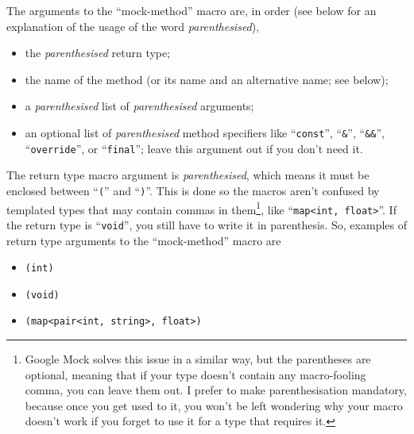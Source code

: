 \documentclass[twoside, a4paper, article]{memoir}
\begin{document}
The arguments to the ``mock-method'' macro are, in order (see below for an
explanation of the usage of the word \emph{parenthesised}),
\begin{itemize}
\item the \emph{parenthesised} return type;
\item the name of the method (or its name and an alternative name; see below);
\item a \emph{parenthesised} list of \emph{parenthesised} arguments;
\item an optional list of \emph{parenthesised} method specifiers like
  ``\texttt{const}'', ``\texttt{\&}'', ``\texttt{\&\&}'', ``\texttt{override}'', or ``\texttt{final}''; leave this
  argument out if you don't need it.
\end{itemize}

The return type macro argument is \emph{parenthesised}, which means it must be
enclosed between ``\texttt{(}'' and ``\texttt{)}''.  This is done so the macros
aren't confused by templated types that may contain commas in
them\footnote{Google Mock solves this issue in a similar way, but the
  parentheses are optional, meaning that if your type doesn't contain any
  macro-fooling comma, you can leave them out.  I prefer to make
  parenthesisation mandatory, because once you get used to it, you won't be
  left wondering why your macro doesn't work if you forget to use it for a type
  that requires it.}, like ``\texttt{map<int, float>}''.  If the return type is
``\texttt{void}'', you still have to write it in parenthesis.  So, examples of
return type arguments to the ``mock-method'' macro are
\begin{itemize}
\item \texttt{(int)}
\item \texttt{(void)}
\item \texttt{(map<pair<int, string>, float>)}
\end{itemize}
\end{document}
